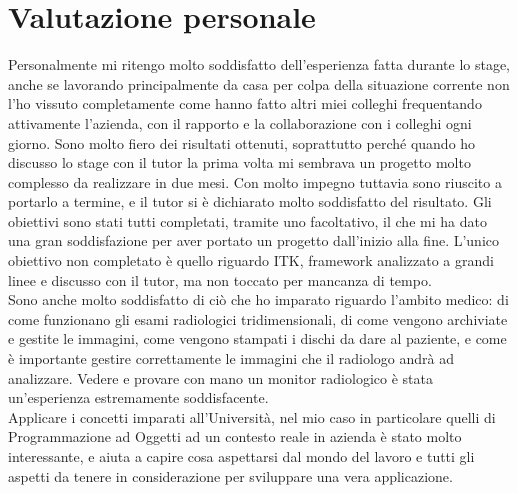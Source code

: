 \section{Valutazione personale}
Personalmente mi ritengo molto soddisfatto dell'esperienza fatta durante lo stage, anche se lavorando principalmente da casa per colpa della situazione corrente non l'ho vissuto completamente come hanno fatto altri miei colleghi frequentando attivamente l'azienda, con il rapporto e la collaborazione con i colleghi ogni giorno. Sono molto fiero dei risultati ottenuti, soprattutto perché quando ho discusso lo stage con il tutor la prima volta mi sembrava un progetto molto complesso da realizzare in due mesi. Con molto impegno tuttavia sono riuscito a portarlo a termine, e il tutor si è dichiarato molto soddisfatto del risultato. Gli obiettivi sono stati tutti completati, tramite uno facoltativo, il che mi ha dato una gran soddisfazione per aver portato un progetto dall'inizio alla fine. L'unico obiettivo non completato è quello riguardo ITK, framework analizzato a grandi linee e discusso con il tutor, ma non toccato per mancanza di tempo.
\\
Sono anche molto soddisfatto di ciò che ho imparato riguardo l'ambito medico: di come funzionano gli esami radiologici tridimensionali, di come vengono archiviate e gestite le immagini, come vengono stampati i dischi da dare al paziente, e come è importante gestire correttamente le immagini che il radiologo andrà ad analizzare. Vedere e provare con mano un monitor radiologico è stata un'esperienza estremamente soddisfacente.
\\
Applicare i concetti imparati all'Università, nel mio caso in particolare quelli di Programmazione ad Oggetti ad un contesto reale in azienda è stato molto interessante, e aiuta a capire cosa aspettarsi dal mondo del lavoro e tutti gli aspetti da tenere in considerazione per sviluppare una vera applicazione.
